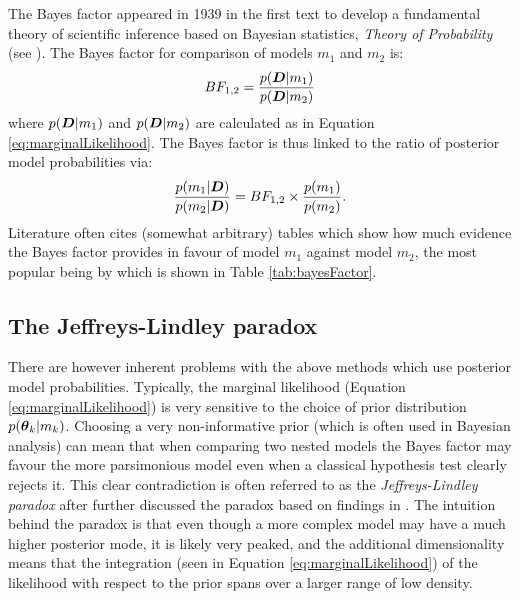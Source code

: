 The Bayes factor  appeared in 1939 in the first text to develop a fundamental theory of scientific inference based on
Bayesian statistics, \textit{Theory of Probability} (see \cite{jeffreys1939}). The Bayes factor for comparison of models
\(m_1\) and \(m_2\) is:
\begin{align}
BF_{1, 2} = \frac{p(\boldsymbol{D} | m_1)}{p(\boldsymbol{D} | m_2)}
\end{align}
where \(p(\boldsymbol{D} | m_1)\) and \(p(\boldsymbol{D} | m_2)\) are calculated as in Equation \eqref{eq:marginalLikelihood}. The Bayes
factor is thus linked to the ratio of posterior model probabilities via:
\begin{align}
\frac{p(m_1 | \boldsymbol{D})}{p(m_2 | \boldsymbol{D})} = BF_{1, 2} \times \frac{p(m_1)}{p(m_2)}.
\end{align}
Literature often cites (somewhat arbitrary) tables which show how much evidence the Bayes factor provides in favour of
model \(m_1\) against model \(m_2\), the most popular being by \cite{kass1995} which is shown in Table \ref{tab:bayesFactor}.
\begin{table}
\centering
{}
\caption{\label{tab:bayesFactor} An interpretation of Bayes factors from \cite{kass1995}}
\end{table}

\subsection{The Jeffreys-Lindley paradox}
\label{sec:Jeffreys_Lindley_paradox}

There are however inherent problems with the above methods which use posterior model probabilities. Typically, the
marginal likelihood (Equation \eqref{eq:marginalLikelihood}) is very sensitive to the choice of prior distribution
\(p(\boldsymbol{\theta}_k | m_k)\). Choosing a very non-informative prior (which is often used in Bayesian analysis) can mean
that when comparing two nested models the Bayes factor may favour the more parsimonious model even when a classical
hypothesis test clearly rejects it. This clear contradiction is often referred to as the \textit{Jeffreys-Lindley
paradox} after \cite{lindley1957} further discussed the paradox based on findings in \cite{jeffreys1939}. The intuition
behind the paradox is that even though a more complex model may have a much higher posterior mode, it is likely very
peaked, and the additional dimensionality means that the integration (seen in Equation \eqref{eq:marginalLikelihood}) of
the likelihood with respect to the prior spans over a larger range of low density.

